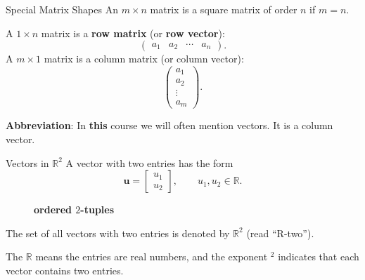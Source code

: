 \begin{frame}{Special Matrix Shapes}
  An $m\times n$ matrix is a \alert{square matrix of order $n$} if $m=n$.

  \medskip
  A $1\times n$ matrix is a \alert{\textbf{row matrix}} (or \textbf{row vector}):
  \[
    \begin{pmatrix}a_1&a_2&\cdots&a_n\end{pmatrix}.
  \]
  A $m\times1$ matrix is a \alert{column matrix} (or column vector):
  \[
    \begin{pmatrix}a_1\\a_2\\\vdots\\a_m\end{pmatrix}.
  \]

  \textbf{Abbreviation}: In \textbf{this} course we will often mention vectors. It is a column vector.

\end{frame}


\begin{frame}{Vectors in $\mathbb{R}^2$}
  A vector with two entries has the form
  \[
    \mathbf{u}=\begin{bmatrix}u_1\\u_2\end{bmatrix},
    \qquad u_1,u_2\in\mathbb{R}.
  \]
  \begin{figure}
    
    \centering
    \textbf{ordered $2$-tuples}

  \end{figure}
  The set of all vectors with two entries is denoted by $\mathbb{R}^2$ (read ``R-two'').

  \medskip
  The $\mathbb{R}$ means the entries are real numbers, and the
  exponent $^2$ indicates that each vector contains two entries.
\end{frame}

